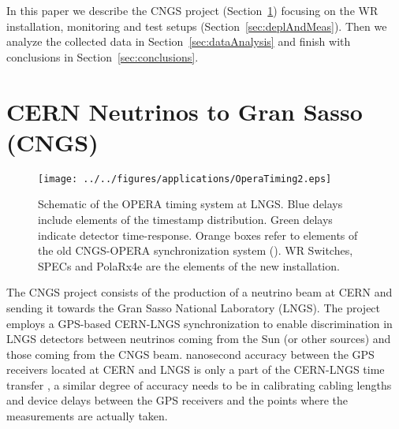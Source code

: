 In this paper we describe the CNGS project (Section~\ref{sec:CNGS}) focusing on the 
WR installation, monitoring and test setups (Section~\ref{sec:deplAndMeas}). 
Then we analyze the collected data in Section~\ref{sec:dataAnalysis} and finish with conclusions
in Section~\ref{sec:conclusions}.



\section{CERN Neutrinos to Gran Sasso (CNGS)}
\label{sec:CNGS}

\begin{figure}[!t]
\centering
\texttt{[image: ../../figures/applications/OperaTiming2.eps]}
\caption{Schematic of the OPERA timing system at LNGS. Blue delays include elements of the 
timestamp distribution. Green delays indicate detector time-response. 
Orange boxes refer to elements of the old CNGS-OPERA synchronization system (\cite{biblio:TOF}). 
WR Switches, SPECs and PolaRx4e are the elements of the new installation.}
\label{fig:operaTiming}
\end{figure}


The CNGS project \cite{biblio:CNGS2000} consists of the production of a neutrino beam at CERN and sending
it towards the Gran Sasso National Laboratory (LNGS). The project employs a GPS-based CERN-LNGS 
synchronization \cite{biblio:BECOHT_CNGS} to enable discrimination in LNGS detectors between 
neutrinos coming from the Sun (or other sources) and those coming from the CNGS beam. 
 nanosecond accuracy between the GPS receivers located at CERN and LNGS is only a part of the 
CERN-LNGS time transfer , a similar degree of accuracy needs to be 
 in 
calibrating cabling lengths and device delays between the GPS receivers and the points where
the measurements are actually taken. 

